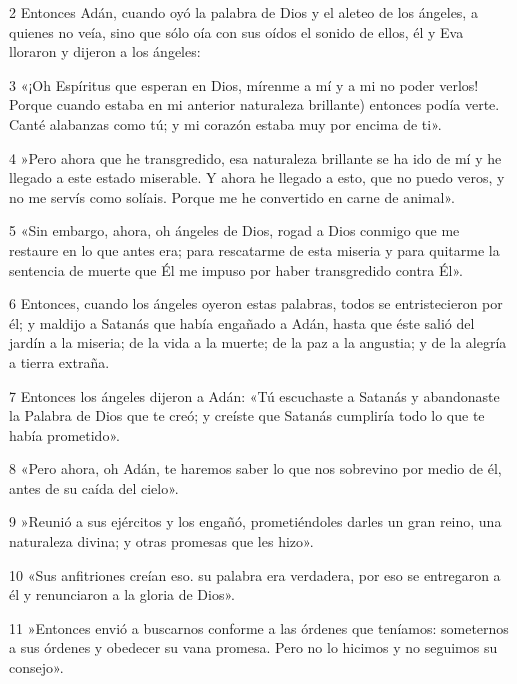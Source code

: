 \par 2 Entonces Adán, cuando oyó la palabra de Dios y el aleteo de los ángeles, a quienes no veía, sino que sólo oía con sus oídos el sonido de ellos, él y Eva lloraron y dijeron a los ángeles:

\par 3 «¡Oh Espíritus que esperan en Dios, mírenme a mí y a mi no poder verlos! Porque cuando estaba en mi anterior naturaleza brillante) entonces podía verte. Canté alabanzas como tú; y mi corazón estaba muy por encima de ti».

\par 4 »Pero ahora que he transgredido, esa naturaleza brillante se ha ido de mí y he llegado a este estado miserable. Y ahora he llegado a esto, que no puedo veros, y no me servís como solíais. Porque me he convertido en carne de animal».

\par 5 «Sin embargo, ahora, oh ángeles de Dios, rogad a Dios conmigo que me restaure en lo que antes era; para rescatarme de esta miseria y para quitarme la sentencia de muerte que Él me impuso por haber transgredido contra Él».

\par 6 Entonces, cuando los ángeles oyeron estas palabras, todos se entristecieron por él; y maldijo a Satanás que había engañado a Adán, hasta que éste salió del jardín a la miseria; de la vida a la muerte; de la paz a la angustia; y de la alegría a tierra extraña.

\par 7 Entonces los ángeles dijeron a Adán: «Tú escuchaste a Satanás y abandonaste la Palabra de Dios que te creó; y creíste que Satanás cumpliría todo lo que te había prometido».

\par 8 «Pero ahora, oh Adán, te haremos saber lo que nos sobrevino por medio de él, antes de su caída del cielo».

\par 9 »Reunió a sus ejércitos y los engañó, prometiéndoles darles un gran reino, una naturaleza divina; y otras promesas que les hizo».

\par 10 «Sus anfitriones creían eso. su palabra era verdadera, por eso se entregaron a él y renunciaron a la gloria de Dios».

\par 11 »Entonces envió a buscarnos conforme a las órdenes que teníamos: someternos a sus órdenes y obedecer su vana promesa. Pero no lo hicimos y no seguimos su consejo».

